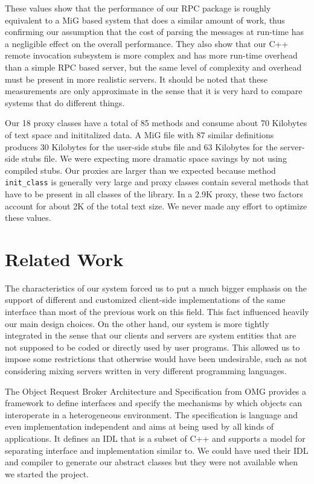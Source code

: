 These values show that the performance of our RPC package is roughly
equivalent to a MiG based system that does a similar amount of work,
thus confirming our assumption that the cost of parsing the messages
at run-time has a negligible effect on the overall performance. They
also show that our C++ remote invocation subsystem is more complex and
has more run-time overhead than a simple RPC based server, but the
same level of complexity and overhead must be present in more
realistic servers. 
It should be noted that these measurements are only approximate in the
sense that it is very hard to compare systems that do different
things.

Our 18 proxy classes have a total of 85 methods and consume about 70
Kilobytes of text space and inititalized data. A MiG file with 87
similar definitions produces 30 Kilobytes for the user-side stubs
file and 63 Kilobytes for the server-side stubs file. We were
expecting more 
dramatic space savings by not using compiled stubs. Our proxies are
larger than we expected because method {\tt init\_class} is generally
very large and proxy classes contain several methods that have to be
present in all classes of the library. In a 2.9K proxy, these two
factors account for about 2K of the total text size. We never made any
effort to optimize these values.

\section{Related Work}

The characteristics of our system forced us to put a much bigger
emphasis on the support of different and customized client-side
implementations of the same interface than most of the previous work
on this field. This fact influenced heavily our main design choices.
On the other hand, our system is more tightly integrated in the sense
that our clients and servers are system entities that are not supposed
to be coded or directly used by user programs. This allowed us to
impose some restrictions that otherwise would have been undesirable,
such as not considering mixing servers written in very different
programming languages. 

The Object Request Broker Architecture and Specification from
OMG\cite{corba} provides a framework to define interfaces and specify
the mechanisms by which objects can interoperate in a heterogeneous
environment. The specification is language and even implementation
independent and aims at being used by all kinds of applications.
It defines an IDL that is a subset of C++ and supports a model for
separating interface and implementation similar to\cite{martin}. We
could have used their IDL and compiler to generate our abstract
classes but they were not available when we started the
project\cite{pjg-iwoos90}. 

